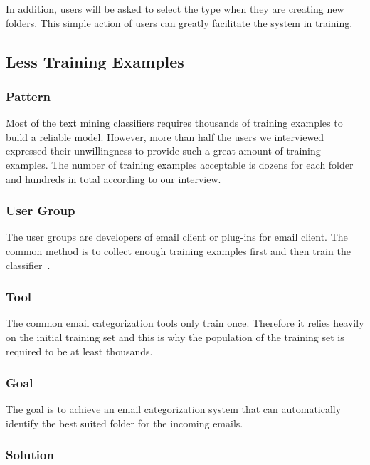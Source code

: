 \documentclass{sig-alternate-05-2015}
\begin{document}
In addition, users will be asked to select the type when they are creating new folders. This simple action of users can greatly facilitate the system in training.

\subsection{Less Training Examples}

\subsubsection{Pattern}

Most of the text mining classifiers requires thousands of training examples to build a reliable model. However, more than half the users we interviewed expressed their unwillingness to provide such a great amount of training examples. The number of training examples acceptable is dozens for each folder and hundreds in total according to our interview.

\subsubsection{User Group}

The user groups are developers of email client or plug-ins for email client. The common method is to collect enough training examples first and then train the classifier~\cite{bekkerman2004automatic}. 

\subsubsection{Tool}

The common email categorization tools only train once. Therefore it relies heavily on the initial training set and this is why the population of the training set is required to be at least thousands.

\subsubsection{Goal}

The goal is to achieve an email categorization system that can automatically identify the best suited folder for the incoming emails.

\subsubsection{Solution}
\end{document}
